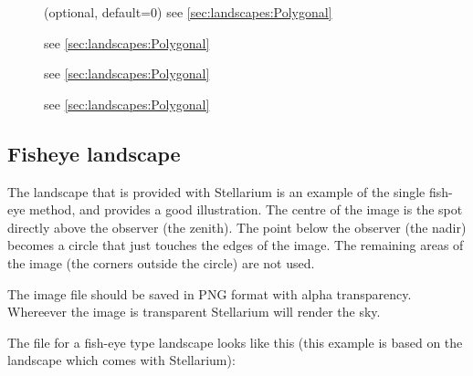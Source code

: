 \begin{description}
\item[] (optional, default=0) see \ref{sec:landscapes:Polygonal} %
\item[] see \ref{sec:landscapes:Polygonal}  %
\item[]  see \ref{sec:landscapes:Polygonal} %
\item[] see \ref{sec:landscapes:Polygonal}  %
\end{description}


\subsection{Fisheye landscape}
\label{sec:landscapes:Fisheye}

The  landscape that is provided with Stellarium is an
example of the single fish-eye method, and provides a good
illustration. The centre of the image is the spot directly above the
observer (the zenith). The point below the observer (the nadir)
becomes a circle that just touches the edges of the image. The
remaining areas of the image (the corners outside the circle) are not
used.

The image file should be saved in PNG format with alpha
transparency. Whereever the image is transparent  Stellarium
will render the sky.

The  file for a fish-eye type landscape looks like
this (this example is based on the  landscape which
comes with Stellarium):

